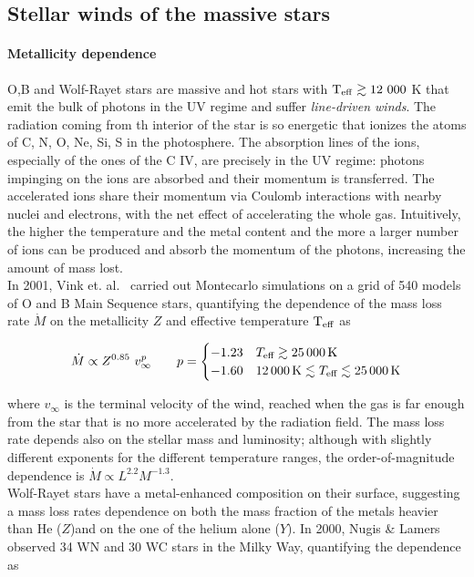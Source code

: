 \documentclass[a4paper,titlepage]{book}     	%
\newcommand{\mdot}{\ensuremath{\dot{M}}}
\begin{document}
\subsection{Stellar winds of the massive stars}\label{subsec:stellarwinds}
\paragraph{Metallicity dependence} O,B and Wolf-Rayet stars are massive and hot stars with $\rm T_{\rm eff} \gtrsim 12~000$ K that emit the bulk of photons in the UV regime and suffer \emph{line-driven winds}. The radiation coming from th interior of the star is so energetic that ionizes the atoms of C, N, O, Ne, Si, S in the photosphere. The absorption lines of the ions, especially of the ones of the C IV, are precisely in the UV regime: photons impinging on the ions are absorbed and their momentum is transferred. The accelerated ions share their momentum via Coulomb interactions with nearby nuclei and electrons, with the net effect of accelerating the whole gas. Intuitively, the higher the temperature and the metal content and the more a larger number of ions can be produced and absorb the momentum of the photons, increasing the amount of mass lost.\\

In 2001, Vink et. al.\ \cite{Vink2001} carried out Montecarlo simulations on a grid of 540 models of O and B Main Sequence stars, quantifying the dependence of the mass loss rate $\mdot$ on the metallicity $Z$ and effective temperature $\rm T_{\rm eff}$ as

\begin{equation}\label{eq:Vink2001}
\dot{M} \propto Z^{0.85}~v_\infty^p \quad \quad p = 
\begin{cases}
-1.23 & T_\textup{eff} \gtrsim \SI{25 000}{K} \\
-1.60 & \SI{12 000}{K} \lesssim T_\textup{eff} \lesssim \SI{25 000}{K}
\end{cases}
\end{equation}

where $v_\infty$ is the terminal velocity of the wind, reached when the gas is far enough from the star that is no more accelerated by the radiation field. The mass loss rate depends also on the stellar mass and luminosity; although with slightly different exponents for the different temperature ranges, the order-of-magnitude dependence is $\mdot \propto L^{2.2} M^{-1.3}$. \\

Wolf-Rayet stars have a metal-enhanced composition on their surface, suggesting a mass loss rates dependence on both the mass fraction of the metals heavier than He ($Z$)and on the one of the helium alone ($Y$). In 2000, Nugis \& Lamers \cite{Nugis2000_WRwinds} observed 34 WN and 30 WC stars in the Milky Way, quantifying the dependence as
\end{document}
